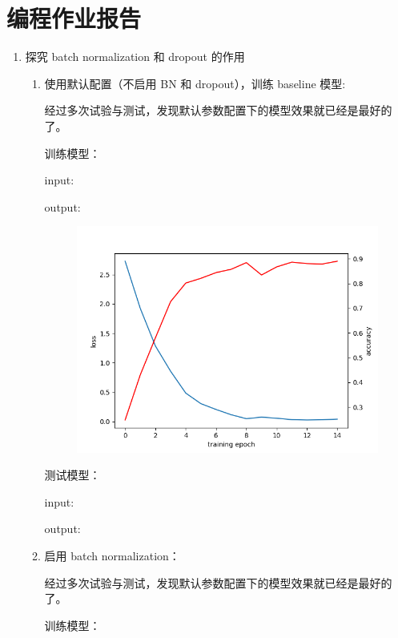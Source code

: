 \documentclass[a4paper]{article}
\begin{document}
\section{编程作业报告}
\begin{enumerate}
    \item 探究 batch normalization 和 dropout 的作用
    
    \begin{enumerate}
        \item 使用默认配置（不启用 BN 和 dropout），训练 baseline 模型:
        
        经过多次试验与测试，发现默认参数配置下的模型效果就已经是最好的了。

        训练模型：
        
        input:
        

        output:
        
        \begin{figure}[H]
            \centering
            \includegraphics[width=0.65\linewidth]{../result/1_1-0.png}
            \caption{}
        \end{figure}

        测试模型：

        input:
        

        output:
        
        \vspace{2em}

        \item 启用 batch normalization：
        
        经过多次试验与测试，发现默认参数配置下的模型效果就已经是最好的了。

        训练模型：


\end{enumerate}
\end{enumerate}
\end{document}
